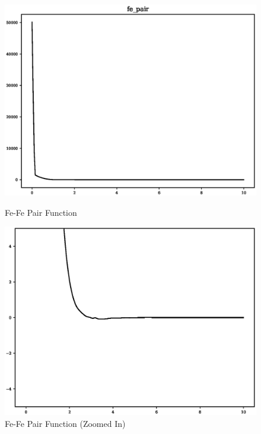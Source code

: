 \begin{figure}[ht] 
  \begin{minipage}[b]{0.5\linewidth}
    \centering
    \includegraphics[width=.9\linewidth]{chapters/results_potential_fitting/pot_fepd_fcc_1/fe_pair.eps} 
    \caption{Fe-Fe Pair Function} 
  \end{minipage}%
  \begin{minipage}[b]{0.5\linewidth}
    \centering
    \includegraphics[width=.9\linewidth]{chapters/results_potential_fitting/pot_fepd_fcc_1/fe_pair_zoom.eps} 
    \caption{Fe-Fe Pair Function (Zoomed In)} 
  \end{minipage} 
  \begin{minipage}[b]{0.5\linewidth}
    \centering

\end{minipage}
\end{figure}
